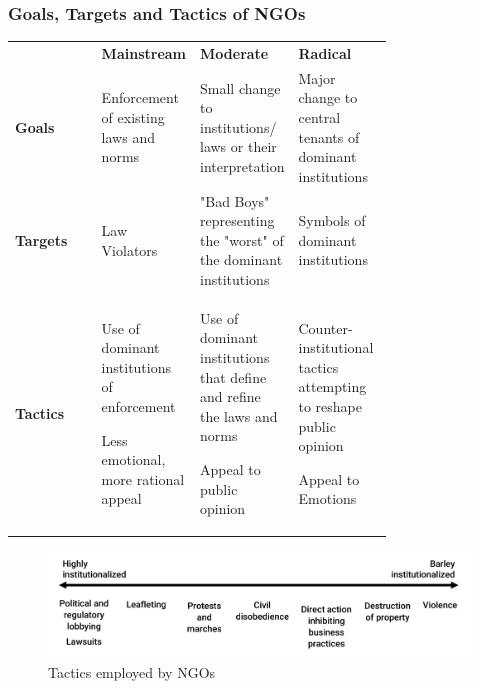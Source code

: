 \documentclass[11pt]{article}
\theoremstyle{definition}
\begin{document}
\clearpage
\subsubsection{Goals, Targets and Tactics of NGOs}
\begin{tabularx}{\linewidth}{l p{0.25\linewidth} p{0.25\linewidth} p{0.25\linewidth}}
	\cellcolor{DodgerBlue1!40} & \cellcolor{DodgerBlue1!40} \textbf{Mainstream} & \cellcolor{DodgerBlue1!40} \textbf{Moderate} & \cellcolor{DodgerBlue1!40} \textbf{Radical}\\
	\textbf{Goals} & Enforcement of existing laws and norms & Small change to institutions/ laws or their interpretation & Major change to central tenants of dominant institutions \\
	\textbf{Targets} & Law Violators & "Bad Boys" representing the "worst" of the dominant institutions & Symbols of dominant institutions\\
	\textbf{Tactics} & \begin{itemize}[
			left=0pt,
			nosep,
			before={\begin{minipage}[t]{\hsize}},
			after={\end{minipage}}
		]
		\item Use of dominant institutions of enforcement
		\item Less emotional, more rational appeal
	\end{itemize} & \begin{itemize}[
		left=0pt,
		nosep,
		before={\begin{minipage}[t]{\hsize}},
		after={\end{minipage}}
	]
		\item Use of dominant institutions that define and refine the laws and norms
		\item  Appeal to public opinion
	\end{itemize} & \begin{itemize}[
	left=0pt,
	nosep,
	before={\begin{minipage}[t]{\hsize}},
		after={\end{minipage}}
	]
		\item Counter-institutional tactics attempting to reshape public opinion
		\item Appeal to Emotions
\end{itemize}
\end{tabularx}
\begin{figure}[H]
	\centering
	\includegraphics[width=0.8\linewidth]{img/ngo_tactics}
	\caption{Tactics employed by NGOs}
	\label{fig:ngotactics}
\end{figure}
\end{document}
